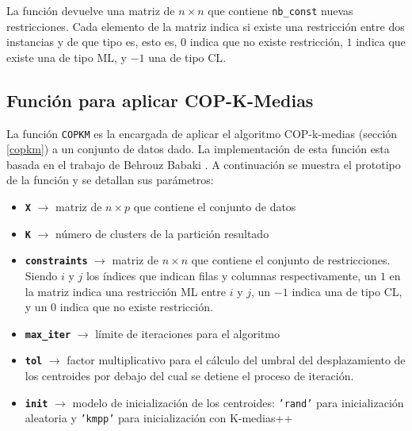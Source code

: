 La función devuelve una matriz de $n \times n$ que contiene \texttt{nb\_const} nuevas restricciones. Cada elemento de la matriz indica si existe una restricción entre dos instancias y de que tipo es, esto es, $0$ indica que no existe restricción, $1$ indica que existe una de tipo \acs{ML}, y $-1$ una de tipo \acs{CL}.

\subsection{Función para aplicar COP-K-Medias}

La función \texttt{COPKM} es la encargada de aplicar el algoritmo COP-k-medias (sección \ref{copkm}) a un conjunto de datos dado. La implementación de esta función esta basada en el trabajo de Behrouz Babaki \cite{behrouz}. A continuación se muestra el prototipo de la función y se detallan sus parámetros:


\begin{itemize}
	
	\item \textbf{\texttt{X}} {$\longrightarrow$ matriz de $n \times p$ que contiene el conjunto de datos}
	
	\item \textbf{\texttt{K}} {$\longrightarrow$ número de clusters de la partición resultado}
	
	\item \textbf{\texttt{constraints}} {$\longrightarrow$ matriz de $n \times n$ que contiene el conjunto de restricciones. Siendo $i$ y $j$ los índices que indican filas y columnas respectivamente, un $1$ en la matriz indica una restricción \acs{ML} entre $i$ y $j$, un $-1$ indica una de tipo \acs{CL}, y un $0$ indica que no existe restricción.}
	
	\item \textbf{\texttt{max\_iter}} {$\longrightarrow$ límite de iteraciones para el algoritmo}
	
	\item \textbf{\texttt{tol}} {$\longrightarrow$ factor multiplicativo para el cálculo del umbral del desplazamiento de los centroides por debajo del cual se detiene el proceso de iteración.}
	
	\item \textbf{\texttt{init}} {$\longrightarrow$ modelo de inicialización de los centroides: \texttt{'rand'} para inicialización aleatoria y \texttt{'kmpp'} para inicialización con K-medias++}
	
\end{itemize}

